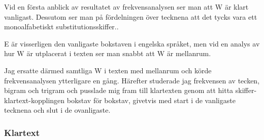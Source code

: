 \documentclass[a4paper,11pt]{article}
\begin{document}
			Vid en första anblick av resultatet av frekvensanalysen ser man att W är klart vanligast. Dessutom ser man på fördelningen över tecknena att det tycks vara ett monoalfabetiskt substitutionsskiffer..
			
			E är visserligen den vanligaste bokstaven i engelska språket, men vid en analys av hur W är utplacerat i texten ser man snabbt att W är mellanrum. 

			Jag ersatte därmed samtliga W i texten med mellanrum och körde frekvensanalysen ytterligare en gång. Härefter studerade jag frekvensen av tecken, bigram och trigram och pusslade mig fram till klartexten genom att hitta skiffer-klartext-kopplingen bokstav för bokstav, givetvis med start i de vanligaste tecknena och slut i de ovanligaste.

			\subsubsection{Klartext}
				
\end{document}
